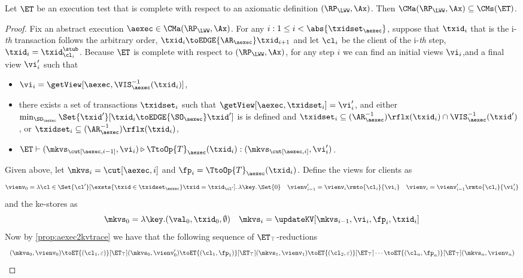 \begin{theorem}
\label{thm:et_complete}
Let $\ET$ be an execution test that is complete with respect to an axiomatic definition $(\RP_{\LWW}, \Ax)$. 
Then $\CMa(\RP_{\LWW}, \Ax) \subseteq \CMs(\ET)$.
\end{theorem}
\begin{proof}
Fix an abstract execution $\aexec \in \CMa(\RP_{\LWW}, \Ax)$. 
For any \(i : 1 \leq i < \abs{\txidset_\aexec} \), suppose that \( \txid_i \) that is the i-\emph{th} transaction follows the arbitrary order, \ie $\txid_{i} \toEDGE{\AR_{\aexec}} \txid_{i+1}$ 
and let $\cl_{i}$ be the client of the i-\emph{th} step, \ie $\txid_{i} = \txid_{\cl_{i}}^{\stub}$.
Because $\ET$ is complete with respect to $(\RP_{\LWW}, \Ax)$, 
for any step $i$ we can find an initial views $\vi_i$,and a final view $\vi'_{i}$ such that 
\begin{itemize}
\item $\vi_i = \getView[\aexec, \VIS^{-1}_{\aexec}(\txid_{i})]$, 
\item there exists a set of transactions $\txidset_{i}$ such that $\getView[\aexec, \txidset_{i}] = \vi'_{i}$, and 
either $\min_{\SO_{\aexec}}\Set{\txid' }[ \txid_{i} \toEDGE{\SO_{\aexec}} \txid']$ is 
is defined and $\txidset_{i} \subseteq (\AR_{\aexec}^{-1})\rflx(\txid_{i}) \cap \VIS^{-1}_{\aexec}(\txid')$, 
or $\txidset_{i} \subseteq (\AR_{\aexec}^{-1})\rflx(\txid_{i})$, 
\item $\ET \vdash (\mkvs_{\cut[\aexec, i-1]}, \vi_i) \triangleright \TtoOp{T}_{\aexec}(\txid_{i}): (\mkvs_{\cut[\aexec, i]}, \vi'_{i})$.
\end{itemize}
Given above, let $\mkvs_{i} = \cut[\aexec, i]$ and $\fp_{i} = \TtoOp{T}_{\aexec}(\txid_{i})$. Define the views for clients as 
\[
\vienv_{0} = \lambda \cl \in \Set{\cl' }[ \exsts{ \txid \in \txidset_{\aexec} } \txid = \txid_{\cl'}] \ldotp \lambda \key \ldotp \Set{0}
\quad \vienv'_{i-1} = \vienv_{i}\rmto{\cl_{i}}{ \vi_i}
\quad \vienv_{i} = \vienv'_{i-1}\rmto{\cl_{i} }{\vi'_{i}}
\]
and the ke-stores as
\[
\mkvs_{0} = \lambda \key.(\val_{0}, \txid_{0}, \emptyset)
\quad \mkvs_{i} = \updateKV[\mkvs_{i-1}, \vi_i, \fp_{i}, \txid_{i}]
\]
Now by \cref{prop:aexec2kvtrace} we have that the following sequence of $\ET_{\top}$-reductions 
\[
\begin{array}{l}
(\mkvs_{0}, \vienv_{0}) \toET{(\cl_{1}, \varepsilon)}[\ET_{\top}] (\mkvs_{0}, \vienv'_{0}) 
\toET{(\cl_{1}, \fp_{1})}[\ET_{\top}] (\mkvs_{1}, \vienv_{1}) 
\toET{(\cl_{2}, \varepsilon)}[\ET_{\top}]
\cdots \toET{(\cl_{n}, \fp_{n})}[\ET_{\top}] (\mkvs_{n}, \vienv_{n})

\end{array}\]
\end{proof}
